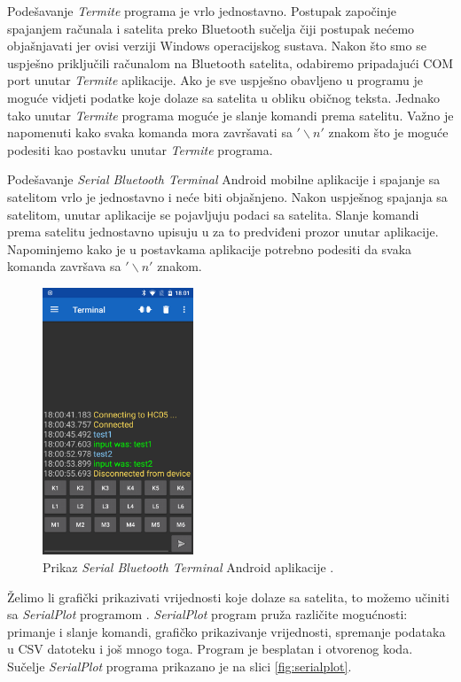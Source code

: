 \documentclass[times, utf8, diplomski, numeric]{templates/template}
\begin{document}
{{        Podešavanje \emph{Termite} programa je vrlo jednostavno. Postupak započinje spajanjem računala i satelita preko Bluetooth sučelja čiji postupak nećemo objašnjavati jer ovisi verziji Windows operacijskog sustava. Nakon što smo se uspješno priključili računalom na Bluetooth satelita, odabiremo pripadajući COM port unutar \emph{Termite} aplikacije. Ako je sve uspješno obavljeno u programu je moguće vidjeti podatke koje dolaze sa satelita u obliku običnog teksta. Jednako tako unutar \emph{Termite} programa moguće je slanje komandi prema satelitu. Važno je napomenuti kako svaka komanda mora završavati sa $'\backslash n'$ znakom što je moguće podesiti kao postavku unutar \emph{Termite} programa. 

        Podešavanje \emph{Serial Bluetooth Terminal} Android mobilne aplikacije i spajanje sa satelitom vrlo je jednostavno i neće biti objašnjeno. Nakon uspješnog spajanja sa satelitom, unutar aplikacije se pojavljuju podaci sa satelita. Slanje komandi prema satelitu jednostavno upisuju u za to predviđeni prozor unutar aplikacije. Napominjemo kako je u postavkama aplikacije potrebno podesiti da svaka komanda završava sa $'\backslash n'$ znakom. 

        \begin{figure}[htb]
        \centering
        \includegraphics[width=0.4\textwidth]{images/mobilna_app.png}
        \caption{Prikaz \emph{Serial Bluetooth Terminal} Android aplikacije \cite{mobilna_app}.}
        \label{fig:mobilna_app}
        \end{figure}

        Želimo li grafički prikazivati vrijednosti koje dolaze sa satelita, to možemo učiniti sa \emph{SerialPlot} programom \cite{serialplot}. \emph{SerialPlot} program pruža različite mogućnosti: primanje i slanje komandi, grafičko prikazivanje vrijednosti, spremanje podataka u CSV datoteku i još mnogo toga. Program je besplatan i otvorenog koda. Sučelje \emph{SerialPlot} programa prikazano je na slici \ref{fig:serialplot}.

}}
\end{document}
